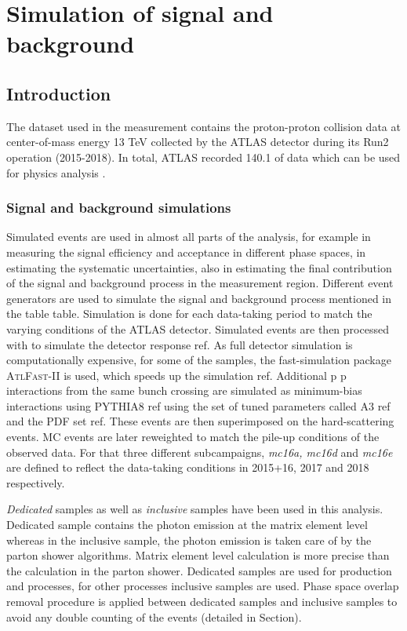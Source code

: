 \chapter{Simulation of signal and background}
\label{Simulation}

\section{Introduction}
\label{sec:data-and-mc-simulations}

The dataset used in the measurement contains the proton-proton collision data at center-of-mass energy 13 TeV collected by the ATLAS detector during its Run2 operation (2015-2018). In total, ATLAS recorded 140.1 \ifb of data which can be used for physics analysis \cite{Aad_2020}.

\subsection{Signal and background simulations}
Simulated events are used in almost all parts of the analysis, for example in measuring the signal efficiency and acceptance in different phase spaces, in estimating the systematic uncertainties, also in estimating the final contribution of the signal and background process in the measurement region. Different event generators are used to simulate the signal and background process mentioned in the table {table}. Simulation is done for each data-taking period to match the varying conditions of the ATLAS detector.
Simulated events are then processed with \GEANT to simulate the detector response {ref}. As full detector simulation is computationally expensive, for some of the samples, the fast-simulation package \textsc{AtlFast-II} is used, which speeds up the simulation {ref}. Additional p p interactions from the same bunch crossing are simulated as minimum-bias interactions using PYTHIA8 {ref} using the set of tuned parameters called A3 {ref} and the \nnpdflo PDF set {ref}. These events are then superimposed on the hard-scattering events. MC events are later reweighted to match the pile-up conditions of the observed data. For that three different subcampaigns, \textit{mc16a, mc16d} and \textit{mc16e} are defined to reflect the data-taking conditions in 2015+16, 2017 and 2018 respectively.

\textit{Dedicated} samples as well as \textit{inclusive} samples have been used in this analysis. Dedicated sample contains the photon emission at the matrix element level whereas in the inclusive sample, the photon emission is taken care of by the parton shower algorithms. Matrix element level calculation is more precise than the calculation in the parton shower. Dedicated samples are used for \tty production and \vgamma processes, for other processes inclusive samples are used. Phase space overlap removal procedure is applied between dedicated samples and inclusive samples to avoid any double counting of the events (detailed in Section). %

